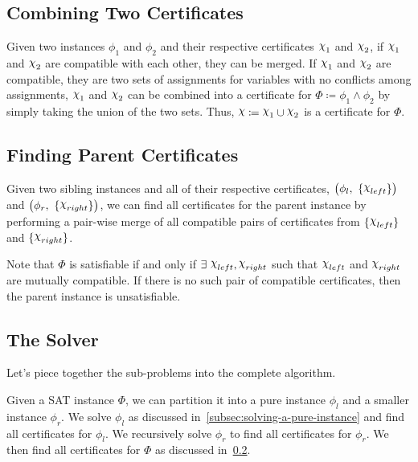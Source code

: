 \subsection{Combining Two Certificates}
\label{subsec:combining-two-certificates}

Given two instances $\phi_1$ and $\phi_2$ and their respective certificates $\rchi_1$ and $\rchi_2$, if $\rchi_1$ and $\rchi_2$ are compatible with each other, they can be merged.
If $\rchi_1$ and $\rchi_2$ are compatible, they are two sets of assignments for variables with no conflicts among assignments, $\rchi_1$ and $\rchi_2$ can be combined into a certificate for $\Phi \coloneqq \phi_1 \land \phi_2$ by simply taking the union of the two sets.
Thus, $\rchi \coloneqq \rchi_1 \cup \rchi_2$ is a certificate for $\Phi$.


\subsection{Finding Parent Certificates}
\label{subsec:finding-parent-certificates}

Given two sibling instances and all of their respective certificates, $\big(\phi_l,~ \{ \rchi_{left} \}\big)$ and $\big(\phi_r,~ \{ \rchi_{right} \}\big)$, we can find all certificates for the parent instance by performing a pair-wise merge of all compatible pairs of certificates from $\{ \rchi_{left} \}$ and $\{ \rchi_{right} \}$.

Note that $\Phi$ is satisfiable if and only if $\exists~ \rchi_{left}, \rchi_{right}$ such that $\rchi_{left}$ and $\rchi_{right}$ are mutually compatible.
If there is no such pair of compatible certificates, then the parent instance is unsatisfiable.

\subsection{The Solver}
\label{subsec:the-solver}

Let's piece together the sub-problems into the complete algorithm.

Given a SAT instance $\Phi$, we can partition it into a pure instance $\phi_l$ and a smaller instance $\phi_r$.
We solve $\phi_l$ as discussed in~\ref{subsec:solving-a-pure-instance} and find all certificates for $\phi_l$.
We recursively solve $\phi_r$ to find all certificates for $\phi_r$.
We then find all certificates for $\Phi$ as discussed in~\ref{subsec:finding-parent-certificates}.
